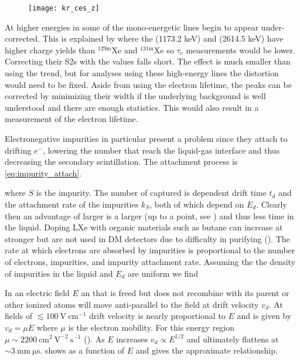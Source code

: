 \begin{figure}
\centering
\texttt{[image: kr\_ces\_z]}
\caption{}
\label{fig:elifetime_fit_kr_z_dependence}
\end{figure}

At higher energies in  some of the mono-energetic lines begin to appear under-corrected.  This
is explained by  where the  (1173.2 keV) and  (2614.5 keV)
have higher charge yields than $\mathrm{^{129m}Xe}$ and $\mathrm{^{131m}Xe}$ so $\tau_e$ measurements would be lower.  Correcting their
S2s with the \metakr values falls short.  The effect is much smaller than using the \alphadecay trend, but for analyses using these
high-energy lines the distortion would need to be fixed.  Aside from using the electron lifetime, the peaks can be corrected by minimizing
their width if the underlying background is well understood and there are enough statistics.  This would also result in a measurement of
the electron lifetime.

Electronegative impurities
in particular present a problem
since they attach to drifting $e^{-}$,
lowering the number that reach the liquid-gas interface and thus decreasing the secondary scintillation.  The attachment process
is \eqref{eq:impurity_attach}.

\noindent where $S$ is the impurity.  The number of \electron captured is dependent drift time $t_{d}$ and the
attachment rate of
the impurities $k_{S}$, both of which depend on $E_{d}$.  Clearly then an advantage of larger
\efields is a larger
\vd (up to a point, see ) and thus less time in the liquid.  Doping LXe with organic materials such as butane
can increase \vd at stronger
\efields but are not used in DM detectors due to difficulty in purifying ().  The rate at which electrons are
absorbed by impurities is proportional to the number of electrons, impurities, and impurity attachment rate.  Assuming the the density
of impurities in the liquid and $E_{d}$ are uniform we find

In an electric field $E$ an \electron that is freed but does not recombine with its parent or other ionized atoms will move anti-parallel
to the field at drift velocity $v_{d}$.  At fields of $\lesssim 100\ \mathrm{V\ cm^{-1}}$ drift velocity is nearly proportional to
$E$ and is given by $v_{d} = \mu E$
where $\mu$ is the electron mobility.  For this energy region $\mu \sim 2200\ \mathrm{cm^{2}\ V^{-2}\ s^{-1}}$ ().  As
$E$ increases $v_{d} \propto E^{1/2}$ and ultimately flattens at $\sim 3\ \mathrm{mm\ \mu s}$.   shows \vd
as a function of $E$ and  gives the approximate relationship.

